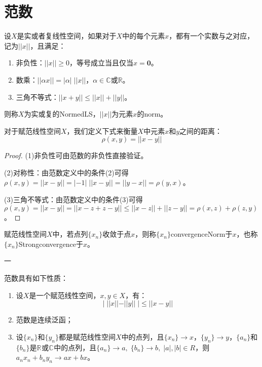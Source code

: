 \section{范数}
\begin{definition}
	设$X$是实或者复线性空间，如果对于$X$中的每个元素$x$，都有一个实数与之对应，记为$||x||$，且满足：
	\begin{enumerate}
		\item 非负性：$||x||\geqslant 0$，等号成立当且仅当$x=\mathbf{0}$。
		\item 数乘：$||\alpha x||=|\alpha|\;||x||$，$\alpha\in\mathbb{C}$或$\mathbb{R}$。
		\item 三角不等式：$||x+y||\leqslant||x||+||y||$。
	\end{enumerate}
	则称$X$为实或复的\gls{NormedLS}，$||x||$为元素$x$的\gls{norm}。
\end{definition}
\begin{definition}
	对于赋范线性空间$X$，我们定义下式来衡量$X$中元素$x$和$y$之间的距离：
	\begin{equation*}
		\rho(x,y)=||x-y||
	\end{equation*}
\end{definition}
\begin{proof}
	(1)非负性可由范数的非负性直接验证。\par
	(2)对称性：由范数定义中的条件(2)可得$\rho(x,y)=||x-y||=|-1|\;||x-y||=||y-x||=\rho(y,x)$。\par
	(3)三角不等式：由范数定义中的条件(3)可得$\rho(x,y)=||x-y||=||x-z+z-y||\leqslant||x-z||+||z-y||=\rho(x,z)+\rho(z,y)$。
\end{proof}
\begin{definition}
	赋范线性空间$X$中，若点列$\{x_n\}$收敛于点$x$，则称$\{x_n\}$\gls{convergenceNorm}于$x$，也称$\{x_n\}$\gls{Strongconvergence}于$x$。
\end{definition}
一
\begin{property}\label{prop:Norm}
	范数具有如下性质：
	\begin{enumerate}
		\item 设$X$是一个赋范线性空间，$x,y\in X$，有：
		\begin{equation*}
			|\;||x||-||y||\;|\leqslant||x-y||
		\end{equation*}
		\item 范数是连续泛函；
		\item 设$\{x_n\}$和$\{y_n\}$都是赋范线性空间$X$中的点列，且$\{x_n\}\rightarrow x$，$\{y_n\}\rightarrow y$，$\{a_n\}$和$\{b_n\}$是$\mathbb{R}^{}$或$\mathbb{C}^{}$中的点列，且$\{a_n\}\to a,\;\{b_n\}\to b,\;|a|,|b|\in R$，则$a_nx_n+b_ny_n\to ax+bx$。 
	\end{enumerate}
\end{property}
